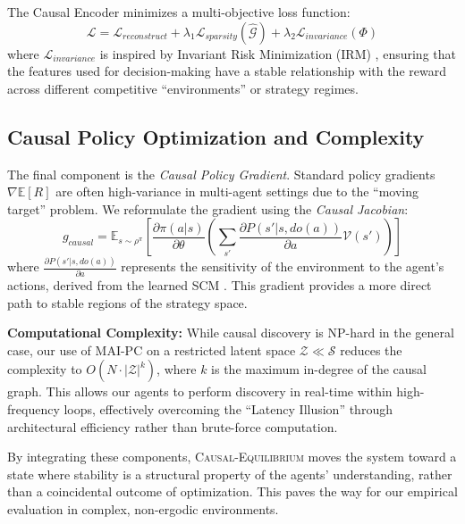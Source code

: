 The Causal Encoder minimizes a multi-objective loss function:
\begin{equation}
\mathcal{L} = \mathcal{L}_{reconstruct} + \lambda_1 \mathcal{L}_{sparsity}(\hat{\mathcal{G}}) + \lambda_2 \mathcal{L}_{invariance}(\Phi)
\end{equation}
where $\mathcal{L}_{invariance}$ is inspired by Invariant Risk Minimization (IRM) \cite{arjovsky2019invariant, zhang2024causal}, ensuring that the features used for decision-making have a stable relationship with the reward across different competitive ``environments'' or strategy regimes.

\subsection{Causal Policy Optimization and Complexity}

The final component is the \textit{Causal Policy Gradient}. Standard policy gradients $\nabla \mathbb{E}[R]$ are often high-variance in multi-agent settings due to the ``moving target'' problem. We reformulate the gradient using the \textit{Causal Jacobian}:
\begin{equation}
g_{causal} = \mathbb{E}_{s \sim \rho^\pi} \left[ \frac{\partial \pi(a|s)}{\partial \theta} \left( \sum_{s'} \frac{\partial P(s' | s, do(a))}{\partial a} \mathcal{V}(s') \right) \right]
\end{equation}
where $\frac{\partial P(s' | s, do(a))}{\partial a}$ represents the sensitivity of the environment to the agent's actions, derived from the learned SCM \cite{wang2024causal_rl}. This gradient provides a more direct path to stable regions of the strategy space.

\textbf{Computational Complexity:} While causal discovery is NP-hard in the general case, our use of MAI-PC on a restricted latent space $\mathcal{Z} \ll \mathcal{S}$ reduces the complexity to $O(N \cdot |\mathcal{Z}|^k)$, where $k$ is the maximum in-degree of the causal graph. This allows our agents to perform discovery in real-time within high-frequency loops, effectively overcoming the ``Latency Illusion'' through architectural efficiency rather than brute-force computation.

By integrating these components, \textsc{Causal-Equilibrium} moves the system toward a state where stability is a structural property of the agents' understanding, rather than a coincidental outcome of optimization. This paves the way for our empirical evaluation in complex, non-ergodic environments.